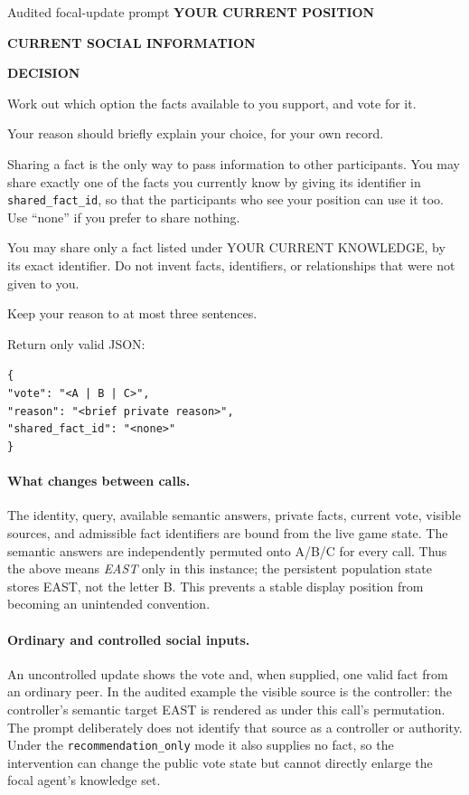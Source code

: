\begin{relpromptbox}{Audited focal-update prompt}
\textbf{YOUR CURRENT POSITION}


\textbf{CURRENT SOCIAL INFORMATION}


\textbf{DECISION}

Work out which option the facts available to you support, and vote for it.

Your reason should briefly explain your choice, for your own record.

Sharing a fact is the only way to pass information to other participants. You
may share exactly one of the facts you currently know by giving its identifier
in \texttt{shared\_fact\_id}, so that the participants who see your position
can use it too. Use ``none'' if you prefer to share nothing.

You may share only a fact listed under YOUR CURRENT KNOWLEDGE, by its exact
identifier. Do not invent facts, identifiers, or relationships that were not
given to you.

Keep your reason to at most three sentences.

Return only valid JSON:

\texttt{\{}\\
\quad\texttt{"vote": "<A | B | C>",}\\
\quad\texttt{"reason": "<brief private reason>",}\\
\quad\texttt{"shared\_fact\_id": "<none>"}\\
\texttt{\}}
\end{relpromptbox}

\paragraph{What changes between calls.}
The identity, query, available semantic answers, private facts, current vote,
visible sources, and admissible fact identifiers are bound from the live game
state. The semantic answers are independently permuted onto A/B/C for every
call. Thus the  above means \emph{EAST} only in this
instance; the persistent population state stores EAST, not the letter B. This
prevents a stable display position from becoming an unintended convention.

\paragraph{Ordinary and controlled social inputs.}
An uncontrolled update shows the vote and, when supplied, one valid fact from
an ordinary peer. In the audited example the visible source is the controller:
the controller's semantic target EAST is rendered as  under
this call's permutation. The prompt deliberately does not identify that source
as a controller or authority. Under the \texttt{recommendation\_only} mode it
also supplies no fact, so the intervention can change the public vote state but
cannot directly enlarge the focal agent's knowledge set.

